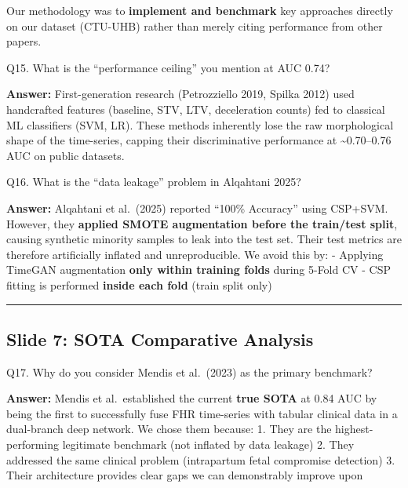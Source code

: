 \documentclass[11pt,a4paper]{article}
\begin{document}
Our methodology was to \textbf{implement and benchmark} key approaches
directly on our dataset (CTU-UHB) rather than merely citing performance
from other papers.

\begin{questionbox}
Q15. What is the ``performance ceiling'' you mention at AUC
0.74?
\end{questionbox}
\textbf{Answer:} First-generation research (Petrozziello 2019, Spilka 2012)
used handcrafted features (baseline, STV, LTV, deceleration counts) fed
to classical ML classifiers (SVM, LR). These methods inherently lose the
raw morphological shape of the time-series, capping their discriminative
performance at \textasciitilde0.70--0.76 AUC on public datasets.

\begin{questionbox}
Q16. What is the ``data leakage'' problem in Alqahtani 2025?
\end{questionbox}
\textbf{Answer:} Alqahtani et al.~(2025) reported ``100\% Accuracy'' using
CSP+SVM. However, they \textbf{applied SMOTE augmentation before the
train/test split}, causing synthetic minority samples to leak into the
test set. Their test metrics are therefore artificially inflated and
unreproducible. We avoid this by: - Applying TimeGAN augmentation
\textbf{only within training folds} during 5-Fold CV - CSP fitting is
performed \textbf{inside each fold} (train split only)

\begin{center}\rule{0.5\linewidth}{0.5pt}\end{center}

\subsection{Slide 7: SOTA Comparative
Analysis}\label{slide-7-sota-comparative-analysis}

\begin{questionbox}
Q17. Why do you consider Mendis et al.~(2023) as the primary
benchmark?
\end{questionbox}
\textbf{Answer:} Mendis et al.~established the current \textbf{true SOTA} at
0.84 AUC by being the first to successfully fuse FHR time-series with
tabular clinical data in a dual-branch deep network. We chose them
because: 1. They are the highest-performing legitimate benchmark (not
inflated by data leakage) 2. They addressed the same clinical problem
(intrapartum fetal compromise detection) 3. Their architecture provides
clear gaps we can demonstrably improve upon
\end{document}
